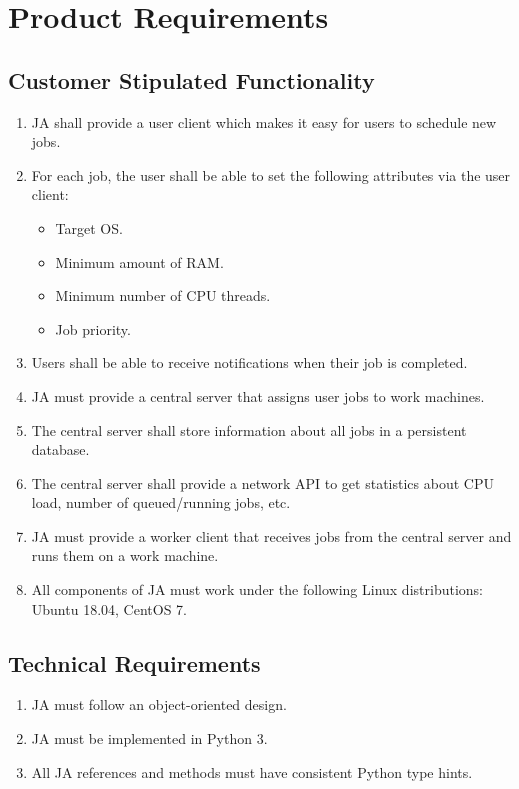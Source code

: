 \chapter{Product Requirements}
\section{Customer Stipulated Functionality}
\begin{enumerate}
  \item JA shall provide a user client which makes it easy for users to schedule new jobs.
  \item For each job, the user shall be able to set the following attributes via the user client:
    \begin{itemize}
      \item Target OS.
      \item Minimum amount of RAM.
      \item Minimum number of CPU threads.
      \item Job priority.
    \end{itemize}
  \item Users shall be able to receive notifications when their job is completed.
  \item JA must provide a central server that assigns user jobs to work machines.
  \item The central server shall store information about all jobs in a persistent database.
  \item The central server shall provide a network API to get statistics about CPU load, number of queued/running jobs, etc.
  \item JA must provide a worker client that receives jobs from the central server and runs them on a work machine.
  \item All components of JA must work under the following Linux distributions: Ubuntu 18.04, CentOS 7.
\end{enumerate}
\section{Technical Requirements}
\begin{enumerate}
  \item JA must follow an object-oriented design.
  \item JA must be implemented in Python 3.
  \item All JA references and methods must have consistent Python type hints.
\end{enumerate}
